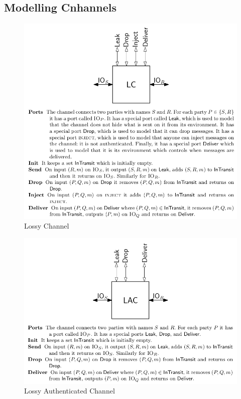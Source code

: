\documentclass[11pt]{article}
\begin{document}
\subsection{Modelling Cnhannels}
\label{sec:org1269d63}
\begin{figure}[htbp]
\centering
\includegraphics[width=.9\linewidth]{A Syntax for Distributed Systems (3)/screenshot_2018-09-02_11-51-41.png}
\caption{\label{fig:orge40e5dd}
Lossy Channel}
\end{figure}


\begin{figure}[htbp]
\centering
\includegraphics[width=.9\linewidth]{A Syntax for Distributed Systems (3)/screenshot_2018-09-02_12-03-24.png}
\caption{\label{fig:org2133f9c}
Lossy Authenticated Channel}
\end{figure}
\end{document}
